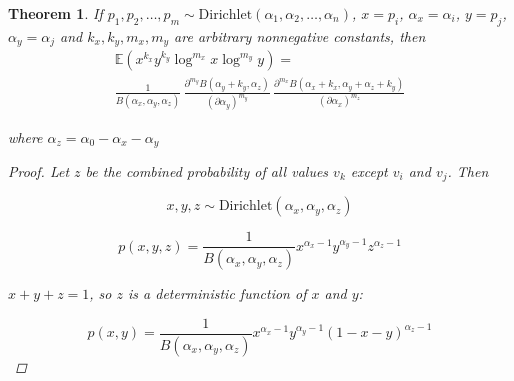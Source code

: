 \documentclass{article}
\begin{document}
\newtheorem{theorem}{Theorem}
\begin{theorem}
If $p_1, p_2, \ldots, p_m \sim \textrm{Dirichlet}(\alpha_1, \alpha_2, \ldots, \alpha_n)$, $x = p_i$, $\alpha_x = \alpha_i$, $y = p_j$, $\alpha_y = \alpha_j$ and $k_x, k_y, m_x, m_y$ are arbitrary nonnegative constants, then 
\begin{multline}
\mathbb{E}(x^{k_x} y^{k_y} \log^{m_x} x \log^{m_y} y) = \\ \frac{1}{B(\alpha_x, \alpha_y, \alpha_z)} \, \frac{\partial^{m_y}B(\alpha_y + k_y, \alpha_z)}{(\partial \alpha_y)^{m_y}} \, \frac{\partial^{m_x}B(\alpha_x + k_x, \alpha_y + \alpha_z + k_y)}{(\partial \alpha_x)^{m_z}}
\end{multline}

where $\alpha_z = \alpha_0 - \alpha_x - \alpha_y$
\begin{proof}
	Let $z$ be the combined probability of all values $v_k$ except $v_i$ and $v_j$. Then
	
	\begin{equation*}
	x, y, z \sim \textrm{Dirichlet}(\alpha_x, \alpha_y, \alpha_z)
	\end{equation*}
	
	\begin{equation}
	p(x, y, z) = \frac{1}{B(\alpha_x, \alpha_y, \alpha_z)} x^{\alpha_x - 1} y^{\alpha_y - 1} z^{\alpha_z - 1}
	\end{equation}
	
	
	$x + y + z = 1$, so $z$ is a deterministic function of $x$ and $y$: 
	
	\begin{equation}
	p(x, y) = \frac{1}{B(\alpha_x, \alpha_y, \alpha_z)} x^{\alpha_x - 1} y^{\alpha_y - 1} (1 - x - y)^{\alpha_z - 1}
	\end{equation}
	

\end{proof}
\end{theorem}
\end{document}
